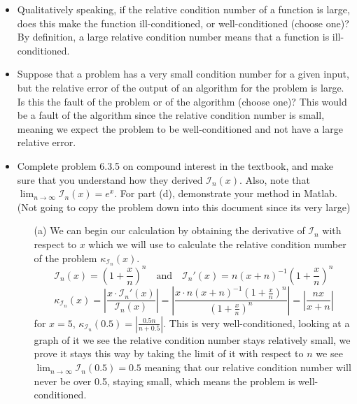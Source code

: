 \documentclass{article}
\begin{document}
\begin{itemize}
    \item Qualitatively speaking, if the relative condition number of a function is large, does this make the function ill-conditioned, or well-conditioned (choose one)?
    \newline\newline
    By definition, a large relative condition number means that a function is ill-conditioned.
    \item Suppose that a problem has a very small condition number for a given input, but the relative error of the output of an algorithm for the problem is large. Is this the fault of the problem or of the algorithm (choose one)?
    \newline\newline
    This would be a fault of the algorithm since the relative condition number is small, meaning we expect the problem to be well-conditioned and not have a large relative error.
    \item Complete problem 6.3.5 on compound interest in the textbook, and make sure that you understand how they derived $\mathcal{I}_n(x)$. Also, note that\newline $\lim_{n\to\infty} \mathcal{I}_n(x) = e^x$. For part (d), demonstrate your method in Matlab. \newline\newline
    (Not going to copy the problem down into this document since its very large)
    \begin{itemize}
        \item[(a)] 
        We can begin our calculation by obtaining the derivative of $\mathcal{I}_n$ with respect to $x$ which we will use to calculate the relative condition number of the problem $\kappa_{\mathcal{I}_n}(x)$.
        \[\mathcal{I}_n(x) = \left(1 + \frac{x}{n}\right)^n \quad \textrm{and} \quad \mathcal{I}_n'(x) = n(x + n)^{-1}\left(1 + \frac{x}{n}\right)^n \]
        \[\kappa_{\mathcal{I}_n}(x) = \left|\frac{x \cdot \mathcal{I}_n'(x)}{\mathcal{I}_n(x)} \right| = \left|\frac{x \cdot n(x + n)^{-1}\left(1 + \frac{x}{n}\right)^n}{\left(1 + \frac{x}{n}\right)^n} \right| = \left|\frac{nx}{x+n}\right|\] 
        for $x = 5$, $\kappa_{\mathcal{I}_n}(0.5) = \left|\frac{0.5n}{n + 0.5}\right|$. This is very well-conditioned, looking at a graph of it we see the relative condition number stays relatively small, we prove it stays this way by taking the limit of it with respect to $n$ we see $\lim_{n\to\infty}\mathcal{I}_n(0.5) = 0.5$ meaning that our relative condition number will never be over 0.5, staying small, which means the problem is well-conditioned.
        

\end{itemize}
\end{itemize}
\end{document}
